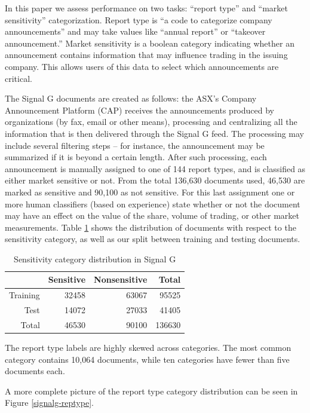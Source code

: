 \documentclass[twocolumn]{article}
\begin{document}
In this paper we assess performance on two tasks: ``report type'' and
``market sensitivity'' categorization. Report type is ``a code to
categorize company announcements'' \cite{asx:02} and may take values
like ``annual report'' or ``takeover announcement.'' Market
sensitivity is a boolean category indicating whether an announcement
contains information that may influence trading in the issuing
company. This allows users of this data to select which announcements
are critical.

The Signal G documents are created as follows: the ASX's Company
Announcement Platform (CAP) receives the announcements produced by
organizations (by fax, email or other means), processing and
centralizing all the information that is then delivered through the
Signal G feed. The processing may include several filtering steps --
for instance, the announcement may be summarized if it is beyond a
certain length.  After such processing, each announcement is manually
assigned to one of 144 report types, and is classified as either
market sensitive or not. From the total 136,630 documents used, 46,530
are marked as sensitive and 90,100 as not sensitive. For this last
assignment one or more human classifiers (based on experience) state
whether or not the document may have an effect on the value of the
share, volume of trading, or other market measurements.  Table
\ref{signalg-sensitivity} shows the distribution of documents with
respect to the sensitivity category, as well as our split between
training and testing documents.

\begin{table}
\begin{tabular}{|r|r|r|r|}
\hline
         & Sensitive & Nonsensitive & Total \\
\hline
Training & 32458     & 63067        & 95525 \\
\hline
Test     & 14072     & 27033        & 41405 \\
\hline
Total    & 46530     & 90100        & 136630\\
\hline
\end{tabular}
\caption{Sensitivity category distribution in Signal G}
\label{signalg-sensitivity}
\end{table}

The report type labels are highly skewed across categories.  The most
common category contains 10,064 documents, while ten categories have
fewer than five documents each.

A more complete picture of the report type category distribution can
be seen in Figure \ref{signalg-reptype}.
\end{document}
